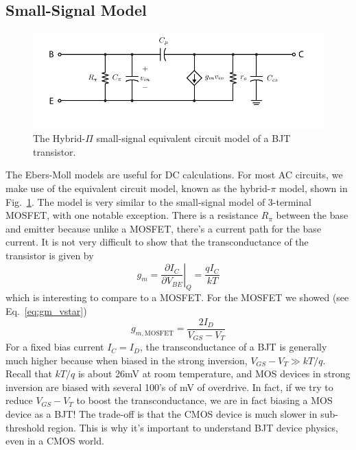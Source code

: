 \subsection{Small-Signal Model}
\begin{figure}[tb]
\centering
\includegraphics[scale=1]{bjt_hybridpi}
\caption{The Hybrid-$\Pi$ small-signal equivalent circuit model of a BJT transistor.} \label{fig:bjt_hybridpi}
\end{figure}
The Ebers-Moll models are useful for DC calculations.  For most AC circuits, we make use of the equivalent circuit model, known as the hybrid-$\pi$ model, shown in Fig.~\ref{fig:bjt_hybridpi}.  The model is very similar to the small-signal model of 3-terminal MOSFET, with one notable exception.  There is a resistance $R_\pi$ between the base and emitter because unlike a MOSFET, there's a current path for the base current.  
It is not very difficult to show that the transconductance of the transistor is given by
    \begin{equation}
        g_m = \left. \frac{\partial I_C}{\partial V_{BE}} \right|_Q =  \frac{qI_C}{kT}
    \end{equation}
which is interesting to compare to a MOSFET.  For the MOSFET we showed (see Eq.~\ref{eq:gm_vstar})
    \begin{equation}
        g_{m,\text{MOSFET}} = \frac{2 I_D}{V_{GS} - V_T}
    \end{equation}
For a fixed bias current $I_C = I_D$, the transconductance of a BJT is generally much higher because when biased in the strong inversion, $V_{GS} - V_T \gg kT/q$.  Recall that $kT/q$ is about 26mV at room temperature, and MOS devices in strong inversion are biased with several 100's of mV of overdrive.  In fact, if we try to reduce $V_{GS}-V_T$ to boost the transconductance, we are in fact biasing a MOS device as a BJT!  The trade-off is that the CMOS device is much slower in sub-threshold region.  This is why it's important to understand BJT device physics, even in a CMOS world.
